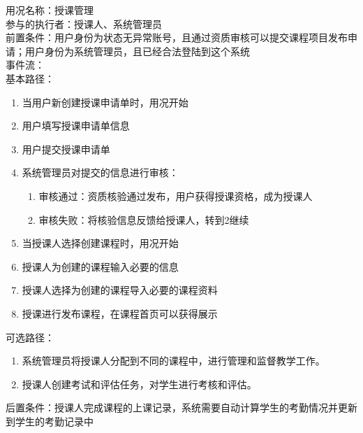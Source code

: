 
\begin{framed}
\noindent
用况名称：授课管理\\
参与的执行者：授课人、系统管理员\\
前置条件：用户身份为状态无异常账号，且通过资质审核可以提交课程项目发布申请；用户身份为系统管理员，且已经合法登陆到这个系统\\
事件流：\\
基本路径：
\begin{enumerate}[itemsep=2pt,topsep=0pt,parsep=0pt,itemindent=1em]
    \item 当用户新创建授课申请单时，用况开始
    \item 用户填写授课申请单信息
    \item 用户提交授课申请单
    \item 系统管理员对提交的信息进行审核：
    \begin{enumerate}[itemsep=2pt,topsep=0pt,parsep=0pt,itemindent=1em]
          \item 审核通过：资质核验通过发布，用户获得授课资格，成为授课人
          \item 审核失败：将核验信息反馈给授课人，转到2继续
      \end{enumerate}
    \item 当授课人选择创建课程时，用况开始
    \item 授课人为创建的课程输入必要的信息
    \item 授课人选择为创建的课程导入必要的课程资料
    \item 授课进行发布课程，在课程首页可以获得展示
\end{enumerate}
\noindent
可选路径：\par
     \begin{enumerate}[itemsep=2pt,topsep=0pt,parsep=0pt,itemindent=1em]  \item 系统管理员将授课人分配到不同的课程中，进行管理和监督教学工作。 \item 授课人创建考试和评估任务，对学生进行考核和评估。  \end{enumerate} 
后置条件：授课人完成课程的上课记录，系统需要自动计算学生的考勤情况并更新到学生的考勤记录中
\end{framed}

